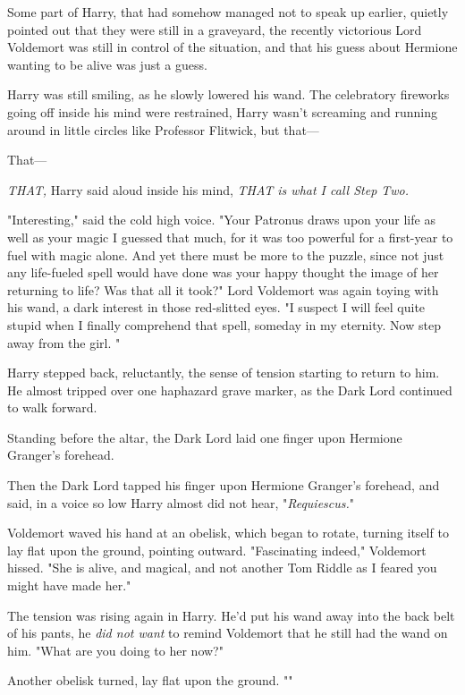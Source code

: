 Some part of Harry, that had somehow managed not to speak up earlier, quietly
pointed out that they were still in a graveyard, the recently victorious Lord
Voldemort was still in control of the situation, and that his guess about
Hermione wanting to be alive was just a guess.

Harry was still smiling, as he slowly lowered his wand. The celebratory
fireworks going off inside his mind were restrained, Harry wasn't screaming and
running around in little circles like Professor Flitwick, but that---

That---

\emph{THAT,} Harry said aloud inside his mind, \emph{THAT is what I call Step
Two.}

"Interesting," said the cold high voice. "Your Patronus draws upon your life as
well as your magic{\el} I guessed that much, for it was too powerful for a
first-year to fuel with magic alone. And yet there must be more to the puzzle,
since not just any life-fueled spell would have done{\el} was your happy
thought the image of her returning to life? Was that all it took?" Lord
Voldemort was again toying with his wand, a dark interest in those red-slitted
eyes. "I suspect I will feel quite stupid when I finally comprehend that spell,
someday in my eternity. Now step away from the girl. "

Harry stepped back, reluctantly, the sense of tension starting to return to
him. He almost tripped over one haphazard grave marker, as the Dark Lord
continued to walk forward.

Standing before the altar, the Dark Lord laid one finger upon Hermione
Granger's forehead.

Then the Dark Lord tapped his finger upon Hermione Granger's forehead, and
said, in a voice so low Harry almost did not hear, "\emph{Requiescus.}"

Voldemort waved his hand at an obelisk, which began to rotate, turning itself
to lay flat upon the ground, pointing outward. "Fascinating indeed," Voldemort
hissed. "She is alive, and magical, and not another Tom Riddle as I feared you
might have made her."

The tension was rising again in Harry. He'd put his wand away into the back
belt of his pants, he \emph{did not want} to remind Voldemort that he still had
the wand on him. "What are you doing to her now?"

Another obelisk turned, lay flat upon the ground. ""

